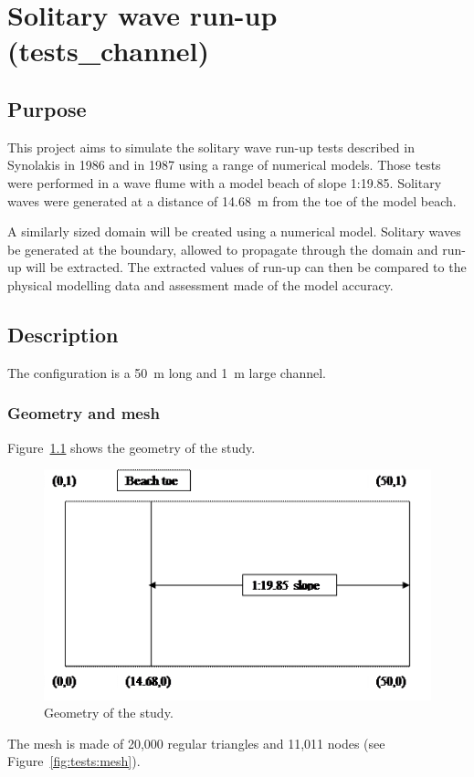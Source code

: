 \chapter{Solitary wave run-up (tests\_channel)}

\section{Purpose}
This project aims to simulate the solitary wave run-up tests described in
Synolakis in 1986 \cite{Synolakis1986} and in 1987 \cite{Synolakis1987} using a range
of numerical models. Those tests were performed in a wave flume with a model
beach of slope 1:19.85. Solitary waves were generated at a distance of 14.68~m
from the toe of the model beach.

A similarly sized domain will be created using a numerical model. Solitary
waves be generated at the boundary, allowed to propagate through the domain and
run-up will be extracted.  The extracted values of run-up can then be compared
to the physical modelling data and assessment made of the model accuracy.

\section{Description}

The configuration is a 50~m long and 1~m large channel.

\subsection{Geometry and mesh}

Figure~\ref{fig:tests:geometry} shows the geometry of the study.

\begin{figure}[H]
\centering
\includegraphics[width=.6\textwidth]{img/geometry.png}
\caption{Geometry of the study.}
\label{fig:tests:geometry}
\end{figure}

The mesh is made of 20,000 regular triangles and 11,011 nodes
(see Figure~\ref{fig:tests:mesh}).

